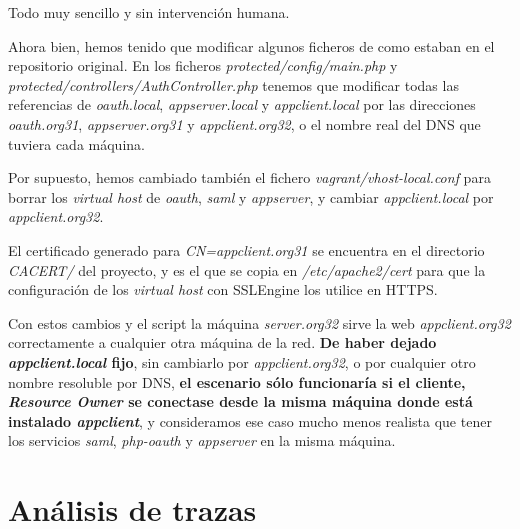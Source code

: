 \documentclass[]{article}
\begin{document}
Todo muy sencillo y sin intervención humana.


\hfill


Ahora bien, hemos tenido que modificar algunos ficheros de como estaban en el repositorio original. En los ficheros \textit{protected/config/main.php} y \textit{protected/controllers/AuthController.php} tenemos que modificar todas las referencias de \textit{oauth.local}, \textit{appserver.local} y \textit{appclient.local} por las direcciones \textit{oauth.org31}, \textit{appserver.org31} y \textit{appclient.org32}, o el nombre real del DNS que tuviera cada máquina.

Por supuesto, hemos cambiado también el fichero \textit{vagrant/vhost-local.conf} para borrar los \textit{virtual host} de \textit{oauth}, \textit{saml} y \textit{appserver}, y cambiar \textit{appclient.local} por \textit{appclient.org32}.

\hfill

El certificado generado para \textit{CN=appclient.org31} se encuentra en el directorio \textit{CACERT/} del proyecto, y es el que se copia en \textit{/etc/apache2/cert} para que la configuración de los \textit{virtual host} con SSLEngine los utilice en HTTPS.



\hfill


Con estos cambios y el script la máquina \textit{server.org32} sirve la web \textit{appclient.org32} correctamente a cualquier otra máquina de la red. \textbf{De haber dejado \textit{appclient.local} fijo}, sin cambiarlo por \textit{appclient.org32}, o por cualquier otro nombre resoluble por DNS, \textbf{el escenario sólo funcionaría si el cliente, \textit{Resource Owner} se conectase desde la misma máquina donde está instalado \textit{appclient}}, y consideramos ese caso mucho menos realista que tener los servicios \textit{saml}, \textit{php-oauth} y \textit{appserver} en la misma máquina.



\section{Análisis de trazas}
\end{document}
